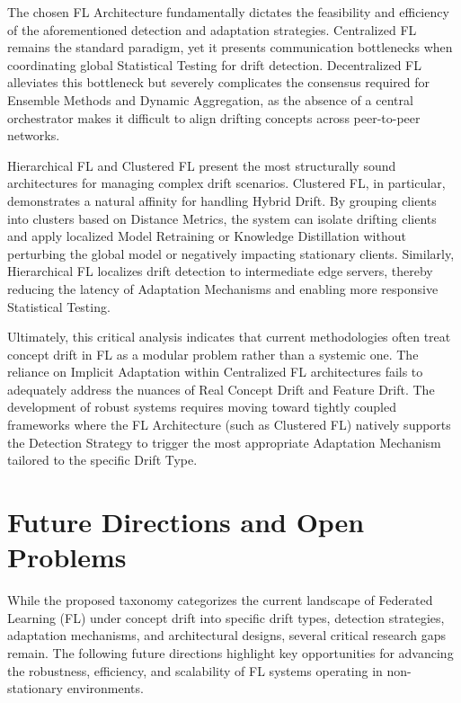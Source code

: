 \documentclass[journal]{IEEEtran}
\begin{document}
The chosen FL Architecture fundamentally dictates the feasibility and efficiency of the aforementioned detection and adaptation strategies. Centralized FL remains the standard paradigm, yet it presents communication bottlenecks when coordinating global Statistical Testing for drift detection. Decentralized FL alleviates this bottleneck but severely complicates the consensus required for Ensemble Methods and Dynamic Aggregation, as the absence of a central orchestrator makes it difficult to align drifting concepts across peer-to-peer networks. 

Hierarchical FL and Clustered FL present the most structurally sound architectures for managing complex drift scenarios. Clustered FL, in particular, demonstrates a natural affinity for handling Hybrid Drift. By grouping clients into clusters based on Distance Metrics, the system can isolate drifting clients and apply localized Model Retraining or Knowledge Distillation without perturbing the global model or negatively impacting stationary clients. Similarly, Hierarchical FL localizes drift detection to intermediate edge servers, thereby reducing the latency of Adaptation Mechanisms and enabling more responsive Statistical Testing. 

Ultimately, this critical analysis indicates that current methodologies often treat concept drift in FL as a modular problem rather than a systemic one. The reliance on Implicit Adaptation within Centralized FL architectures fails to adequately address the nuances of Real Concept Drift and Feature Drift. The development of robust systems requires moving toward tightly coupled frameworks where the FL Architecture (such as Clustered FL) natively supports the Detection Strategy to trigger the most appropriate Adaptation Mechanism tailored to the specific Drift Type.

\section{Future Directions and Open Problems}
\label{sec:future_directions}

While the proposed taxonomy categorizes the current landscape of Federated Learning (FL) under concept drift into specific drift types, detection strategies, adaptation mechanisms, and architectural designs, several critical research gaps remain. The following future directions highlight key opportunities for advancing the robustness, efficiency, and scalability of FL systems operating in non-stationary environments.
\end{document}
